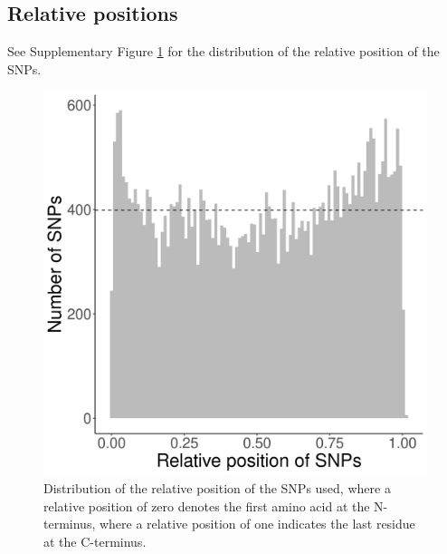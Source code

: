 



\clearpage

\subsection{Relative positions}

See Supplementary Figure \ref{fig:snp_rel_pos}
for the distribution of the relative position of the SNPs.

\begin{figure}[!htbp]
  \includegraphics[width=\textwidth]{ncbi_peregrine_results/fig_snp_rel_pos.png}
  \caption{
    Distribution of the relative position of the SNPs used,
    where a relative position of zero denotes the first amino
    acid at the N-terminus, where a relative position of one
    indicates the last residue at the C-terminus.
  }
  \label{fig:snp_rel_pos}
\end{figure}

